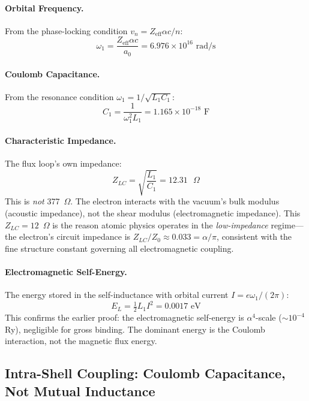 \paragraph{Orbital Frequency.} From the phase-locking condition $v_n = Z_\text{eff} \alpha c / n$:
\begin{equation}
    \omega_1 = \frac{Z_\text{eff} \alpha c}{a_0} = 6.976 \times 10^{16} \text{ rad/s}
\end{equation}

\paragraph{Coulomb Capacitance.} From the resonance condition $\omega_1 = 1/\sqrt{L_1 C_1}$:
\begin{equation}
    C_1 = \frac{1}{\omega_1^2 L_1} = 1.165 \times 10^{-18} \text{ F}
\end{equation}

\paragraph{Characteristic Impedance.} The flux loop's own impedance:
\begin{equation}
    Z_{LC} = \sqrt{\frac{L_1}{C_1}} = 12.31 \text{ $\Omega$}
\end{equation}
This is \emph{not} 377~$\Omega$. The electron interacts with the vacuum's bulk modulus (acoustic impedance), not the shear modulus (electromagnetic impedance). This $Z_{LC} = 12$~$\Omega$ is the reason atomic physics operates in the \emph{low-impedance} regime---the electron's circuit impedance is $Z_{LC}/Z_0 \approx 0.033 = \alpha/\pi$, consistent with the fine structure constant governing all electromagnetic coupling.

\paragraph{Electromagnetic Self-Energy.} The energy stored in the self-inductance with orbital current $I = e\omega_1/(2\pi)$:
\begin{equation}
    E_L = \tfrac{1}{2}L_1 I^2 = 0.0017 \text{ eV}
\end{equation}
This confirms the earlier proof: the electromagnetic self-energy is $\alpha^4$-scale ($\sim 10^{-4}$ Ry), negligible for gross binding. The dominant energy is the Coulomb interaction, not the magnetic flux energy.

\subsection{Intra-Shell Coupling: Coulomb Capacitance, Not Mutual Inductance}

